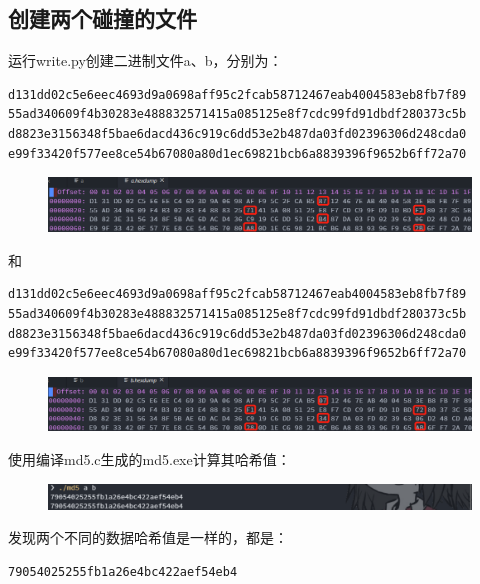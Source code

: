 \documentclass[UTF8, a4paper, 11pt]{article}
\begin{document}
\subsection{创建两个碰撞的文件}
运行write.py创建二进制文件a、b，分别为：
\begin{lstlisting}
d131dd02c5e6eec4693d9a0698aff95c2fcab58712467eab4004583eb8fb7f89 
55ad340609f4b30283e488832571415a085125e8f7cdc99fd91dbdf280373c5b 
d8823e3156348f5bae6dacd436c919c6dd53e2b487da03fd02396306d248cda0 
e99f33420f577ee8ce54b67080a80d1ec69821bcb6a8839396f9652b6ff72a70
\end{lstlisting}
\begin{figure}[H]
    \centering
    \includegraphics[width = \textwidth]{a.png}
\end{figure}
和
\begin{lstlisting}
d131dd02c5e6eec4693d9a0698aff95c2fcab58712467eab4004583eb8fb7f89 
55ad340609f4b30283e488832571415a085125e8f7cdc99fd91dbdf280373c5b 
d8823e3156348f5bae6dacd436c919c6dd53e2b487da03fd02396306d248cda0 
e99f33420f577ee8ce54b67080a80d1ec69821bcb6a8839396f9652b6ff72a70
\end{lstlisting}
\begin{figure}[H]
    \centering
    \includegraphics[width = \textwidth]{b.png}
\end{figure}
使用编译md5.c生成的md5.exe计算其哈希值：
\begin{figure}[H]
    \centering
    \includegraphics[width = \textwidth]{hash_a_b.png}
\end{figure}
发现两个不同的数据哈希值是一样的，都是：
\begin{lstlisting}
79054025255fb1a26e4bc422aef54eb4
\end{lstlisting}
\end{document}
